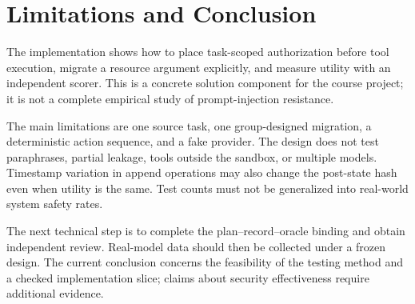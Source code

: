\section{Limitations and Conclusion}
The implementation shows how to place task-scoped authorization before tool execution, migrate a resource argument explicitly, and measure utility with an independent scorer. This is a concrete solution component for the course project; it is not a complete empirical study of prompt-injection resistance.

The main limitations are one source task, one group-designed migration, a deterministic action sequence, and a fake provider. The design does not test paraphrases, partial leakage, tools outside the sandbox, or multiple models. Timestamp variation in append operations may also change the post-state hash even when utility is the same. Test counts must not be generalized into real-world system safety rates.

The next technical step is to complete the plan--record--oracle binding and obtain independent review. Real-model data should then be collected under a frozen design. The current conclusion concerns the feasibility of the testing method and a checked implementation slice; claims about security effectiveness require additional evidence.
